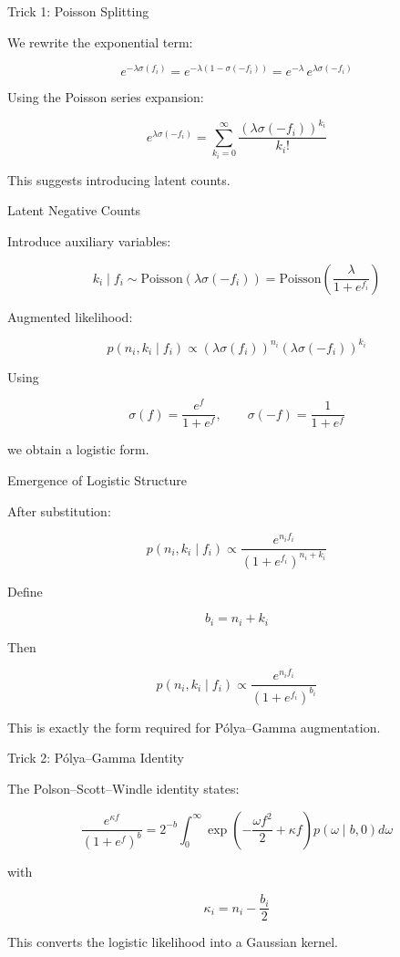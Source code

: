 \documentclass[11pt]{beamer}
\begin{document}
\begin{frame}{Trick 1: Poisson Splitting}

We rewrite the exponential term:

\[
e^{-\lambda\sigma(f_i)}
=
e^{-\lambda(1-\sigma(-f_i))}
=
e^{-\lambda}\,e^{\lambda\sigma(-f_i)}
\]

Using the Poisson series expansion:

\[
e^{\lambda\sigma(-f_i)}
=
\sum_{k_i=0}^{\infty}
\frac{(\lambda\sigma(-f_i))^{k_i}}{k_i!}
\]

This suggests introducing latent counts.

\end{frame}

\begin{frame}{Latent Negative Counts}

Introduce auxiliary variables:

\[
k_i \mid f_i
\sim
\text{Poisson}(\lambda\sigma(-f_i))
=
\text{Poisson}\left(\frac{\lambda}{1+e^{f_i}}\right)
\]

Augmented likelihood:

\[
p(n_i,k_i \mid f_i)
\propto
(\lambda\sigma(f_i))^{n_i}
(\lambda\sigma(-f_i))^{k_i}
\]

Using

\[
\sigma(f)=\frac{e^f}{1+e^f},
\qquad
\sigma(-f)=\frac{1}{1+e^f}
\]

we obtain a logistic form.

\end{frame}

\begin{frame}{Emergence of Logistic Structure}

After substitution:

\[
p(n_i,k_i \mid f_i)
\propto
\frac{e^{n_i f_i}}{(1+e^{f_i})^{n_i+k_i}}
\]

Define

\[
b_i = n_i + k_i
\]

Then

\[
p(n_i,k_i \mid f_i)
\propto
\frac{e^{n_i f_i}}{(1+e^{f_i})^{b_i}}
\]

This is exactly the form required for
Pólya–Gamma augmentation.

\end{frame}

\begin{frame}{Trick 2: Pólya--Gamma Identity}

The Polson--Scott--Windle identity states:

\[
\frac{e^{\kappa f}}{(1+e^f)^b}
=
2^{-b}
\int_0^\infty
\exp\!\left(-\frac{\omega f^2}{2} + \kappa f\right)
p(\omega \mid b,0)
d\omega
\]

with

\[
\kappa_i = n_i - \frac{b_i}{2}
\]

This converts the logistic likelihood
into a Gaussian kernel.

\end{frame}
\end{document}
